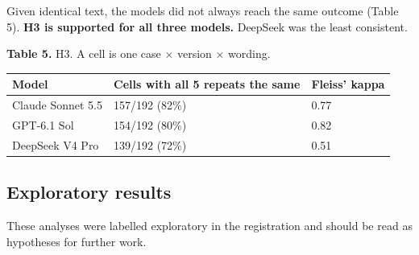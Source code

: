 \documentclass[review,12pt]{elsarticle}
\begin{document}
Given identical text, the models did not always reach the same outcome (Table 5). \textbf{H3 is supported for all three models.} DeepSeek was the least consistent.

\noindent\textbf{Table 5.} H3. A cell is one case × version × wording.

\begin{longtable}[]{@{}lll@{}}
\toprule\noalign{}
Model & Cells with all 5 repeats the same & Fleiss' kappa \\
\midrule\noalign{}
\endhead
\bottomrule\noalign{}
\endlastfoot
Claude Sonnet 5.5 & 157/192 (82\%) & 0.77 \\
GPT-6.1 Sol & 154/192 (80\%) & 0.82 \\
DeepSeek V4 Pro & 139/192 (72\%) & 0.51 \\
\end{longtable}


\hypertarget{exploratory-results}{%
\subsection{Exploratory results}\label{exploratory-results}}

These analyses were labelled exploratory in the registration and should be read as hypotheses for further work.
\end{document}
